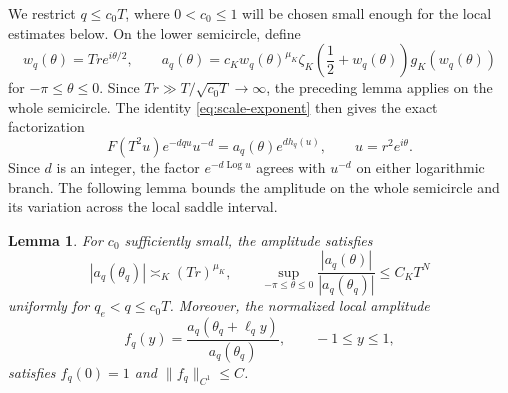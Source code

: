 \documentclass[11pt,reqno]{amsart}
\numberwithin{equation}{section}
\newtheorem{lemma}[theorem]{Lemma}
\DeclareMathOperator{\Log}{Log}
\begin{document}
We restrict $q\le c_0T$, where $0<c_0\le1$ will be chosen small
enough for the local estimates below.
On the lower semicircle, define
\begin{equation}\label{eq:a-definition}
 w_q(\theta)=Tr e^{i\theta/2},\qquad
 a_q(\theta)=c_Kw_q(\theta)^{\mu_K}
     \zeta_K\!\left(\frac12+w_q(\theta)\right)g_K(w_q(\theta))
\end{equation}
for $-\pi\le\theta\le0$. Since
$Tr\gg T/\sqrt{c_0T}\to\infty$, the preceding lemma applies on
the whole semicircle. The identity \eqref{eq:scale-exponent}
then gives the exact factorization
\begin{equation}\label{eq:integrand-factorization}
 F(T^2u)e^{-dqu}u^{-d}=a_q(\theta)e^{dh_q(u)},
 \qquad u=r^2e^{i\theta}.
\end{equation}
Since $d$ is an integer, the factor $e^{-d\Log u}$ agrees with
$u^{-d}$ on either logarithmic branch. The following lemma
bounds the amplitude on the whole semicircle and its variation
across the local saddle interval.

\begin{lemma}\label{lem:amplitude-bounds}
For $c_0$ sufficiently small, the amplitude satisfies
\begin{equation}\label{eq:a-at-saddle}
 |a_q(\theta_q)|\asymp_K(Tr)^{\mu_K},\qquad
 \sup_{-\pi\le\theta\le0}
       \frac{|a_q(\theta)|}{|a_q(\theta_q)|}\le C_KT^N
\end{equation}
uniformly for $q_e<q\le c_0T$. Moreover, the normalized local amplitude
\begin{equation}\label{eq:f-definition}
 f_q(y)=\frac{a_q(\theta_q+\ell_qy)}{a_q(\theta_q)},
 \qquad -1\le y\le1,
\end{equation}
satisfies $f_q(0)=1$ and $\|f_q\|_{C^1}\le C$.
\end{lemma}
\end{document}

